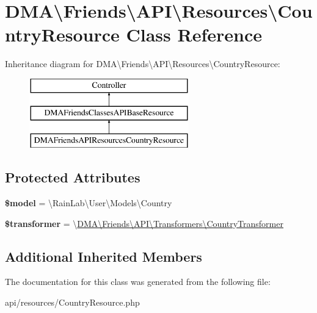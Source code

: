 \hypertarget{classDMA_1_1Friends_1_1API_1_1Resources_1_1CountryResource}{}\section{D\+M\+A\textbackslash{}Friends\textbackslash{}A\+P\+I\textbackslash{}Resources\textbackslash{}Country\+Resource Class Reference}
\label{classDMA_1_1Friends_1_1API_1_1Resources_1_1CountryResource}
Inheritance diagram for D\+M\+A\textbackslash{}Friends\textbackslash{}A\+P\+I\textbackslash{}Resources\textbackslash{}Country\+Resource\+:\begin{figure}[H]
\begin{center}
\leavevmode
\includegraphics[height=3.000000cm]{da/d31/classDMA_1_1Friends_1_1API_1_1Resources_1_1CountryResource}
\end{center}
\end{figure}
\subsection*{Protected Attributes}
\begin{DoxyCompactItemize}
\item 
\hypertarget{classDMA_1_1Friends_1_1API_1_1Resources_1_1CountryResource_afad085f6fe72518db2d0470d21623314}{}{\bfseries \$model} = \textquotesingle{}\textbackslash{}Rain\+Lab\textbackslash{}\+User\textbackslash{}\+Models\textbackslash{}\+Country\textquotesingle{}\label{classDMA_1_1Friends_1_1API_1_1Resources_1_1CountryResource_afad085f6fe72518db2d0470d21623314}

\item 
\hypertarget{classDMA_1_1Friends_1_1API_1_1Resources_1_1CountryResource_a366442f2265666303a645430ffb9d230}{}{\bfseries \$transformer} = \textquotesingle{}\textbackslash{}\hyperlink{classDMA_1_1Friends_1_1API_1_1Transformers_1_1CountryTransformer}{D\+M\+A\textbackslash{}\+Friends\textbackslash{}\+A\+P\+I\textbackslash{}\+Transformers\textbackslash{}\+Country\+Transformer}\textquotesingle{}\label{classDMA_1_1Friends_1_1API_1_1Resources_1_1CountryResource_a366442f2265666303a645430ffb9d230}

\end{DoxyCompactItemize}
\subsection*{Additional Inherited Members}


The documentation for this class was generated from the following file\+:\begin{DoxyCompactItemize}
\item 
api/resources/Country\+Resource.\+php\end{DoxyCompactItemize}
